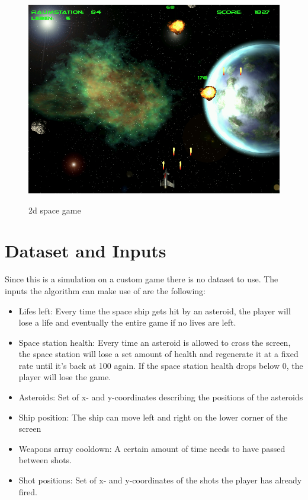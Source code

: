 \documentclass[a4paper,10pt]{article}
\begin{document}
\begin{figure}
 \centering
 \includegraphics[width=\linewidth]{game2.png}
 \label{fig:game}
 \caption{2d space game}
\end{figure}

\section{Dataset and Inputs}
% 
Since this is a simulation on a custom game there is no dataset to use.
The inputs the algorithm can make use of are the following:
\begin{itemize}
 \item Lifes left: Every time the space ship gets hit by an asteroid, the player will lose a life and eventually the entire game if no lives are left.
 \item Space station health: Every time an asteroid is allowed to cross the screen, the space station will lose a set amount of health and regenerate it at a fixed rate until it's back at 100 again. If the space station health drops below $0$, the player will lose the game.
 \item Asteroids: Set of x- and y-coordinates describing the positions of the asteroids
 \item Ship position: The ship can move left and right on the lower corner of the screen
 \item Weapons array cooldown: A certain amount of time needs to have passed between shots.
 \item Shot positions: Set of x- and y-coordinates of the shots the player has already fired.
\end{itemize}
\end{document}
